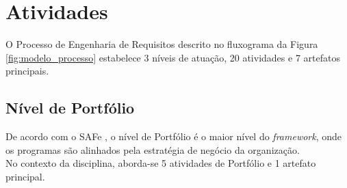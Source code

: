 	\section[Atividades]{Atividades}
	\label{sec:processo_atividades}
		O Processo de Engenharia de Requisitos descrito no fluxograma da Figura \ref{fig:modelo_processo} estabelece 3 níveis de atuação, 20 atividades e 7 artefatos principais.

		\subsection[Nível de Portfólio]{Nível de Portfólio}
		\label{subsec:processo_atividade_portfolio}
			De acordo com o SAFe \cite{safe}, o nível de Portfólio é o maior nível do \emph{framework}, onde os programas são alinhados pela estratégia de negócio da organização.
			\\ \indent No contexto da disciplina, aborda-se 5 atividades de Portfólio e 1 artefato principal.

